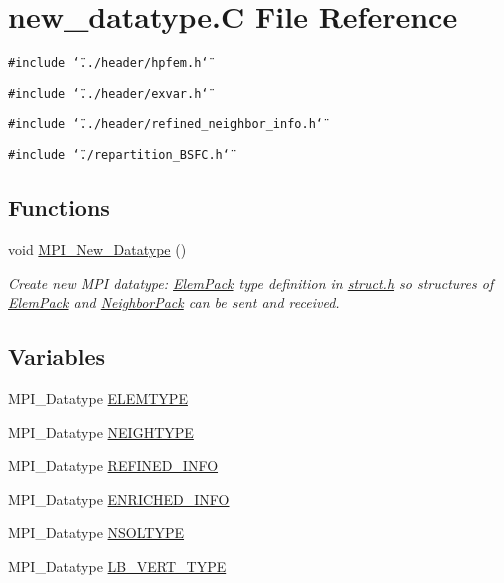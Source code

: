 \hypertarget{new__datatype_8C}{
\section{new\_\-datatype.C File Reference}
\label{new__datatype_8C}
}
{\tt \#include \char`\"{}../header/hpfem.h\char`\"{}}\par
{\tt \#include \char`\"{}../header/exvar.h\char`\"{}}\par
{\tt \#include \char`\"{}../header/refined\_\-neighbor\_\-info.h\char`\"{}}\par
{\tt \#include \char`\"{}./repartition\_\-BSFC.h\char`\"{}}\par
\subsection*{Functions}
\begin{CompactItemize}
\item 
void \hyperlink{new__datatype_8C_a6}{MPI\_\-New\_\-Datatype} ()
\begin{CompactList}\small\item\em Create new MPI datatype: \hyperlink{structElemPack}{Elem\-Pack} type definition in \hyperlink{struct_8h}{struct.h} so structures of \hyperlink{structElemPack}{Elem\-Pack} and \hyperlink{structNeighborPack}{Neighbor\-Pack} can be sent and received. \item\end{CompactList}\end{CompactItemize}
\subsection*{Variables}
\begin{CompactItemize}
\item 
MPI\_\-Datatype \hyperlink{new__datatype_8C_a0}{ELEMTYPE}
\item 
MPI\_\-Datatype \hyperlink{new__datatype_8C_a1}{NEIGHTYPE}
\item 
MPI\_\-Datatype \hyperlink{new__datatype_8C_a2}{REFINED\_\-INFO}
\item 
MPI\_\-Datatype \hyperlink{new__datatype_8C_a3}{ENRICHED\_\-INFO}
\item 
MPI\_\-Datatype \hyperlink{new__datatype_8C_a4}{NSOLTYPE}
\item 
MPI\_\-Datatype \hyperlink{new__datatype_8C_a5}{LB\_\-VERT\_\-TYPE}
\end{CompactItemize}


